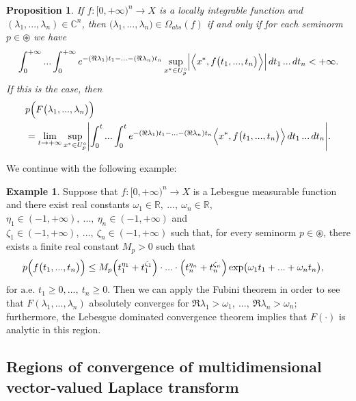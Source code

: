 \documentclass{amsart}
\newtheorem{prop}[thm]{Proposition}
\theoremstyle{definition}
\newtheorem{example}[thm]{Example}
\theoremstyle{remark}
\numberwithin{equation}{section}
\begin{document}
\begin{prop}\label{sor}
If $f: [0,+\infty)^{n}\rightarrow X$ is a locally integrable function and\\ $(\lambda_{1},...,\lambda_{n})\in {\mathbb C}^{n}$, then
$(\lambda_{1},...,\lambda_{n}\bigr)\in \Omega_{abs}(f)$ if and only if for each seminorm $p\in \circledast$ we have 
$$
\int^{+\infty}_{0}...\int^{+\infty}_{0}e^{-(\Re \lambda_{1})t_{1}-...-(\Re \lambda_{n})t_{n}}  \sup_{x^{\ast}\in U_{p}^{\circ}}\Bigl| \Bigl \langle x^{\ast}, f\bigl(t_{1},...,t_{n}\bigr) \Bigr \rangle \Bigr| \, dt_{1}\, ...\, dt_{n}<+\infty.
$$
If this is the case, then 
\begin{align*} &
p\Bigl( F\bigl( \lambda_{1},...,\lambda_{n} \bigr)\Bigr)
\\& =\lim_{t\rightarrow +\infty}\sup_{x^{\ast}\in U_{p}^{\circ}}\Biggl|  \int^{t}_{0}...\int^{t}_{0}e^{-(\Re \lambda_{1})t_{1}-...-(\Re \lambda_{n})t_{n}}  \Bigl \langle x^{\ast}, f\bigl(t_{1},...,t_{n}\bigr) \Bigr \rangle  \, dt_{1}\, ...\, dt_{n}  \Biggr|.
\end{align*}
\end{prop}

We continue with the following example:

\begin{example}\label{pfk}
Suppose that $f: [0,+\infty)^{n} \rightarrow X$ is a Lebesgue measurable function and there exist real constants $\omega_{1}\in {\mathbb R},\ ...,\ \omega_{n}\in {\mathbb R},$ $\eta_{1}\in (-1,+\infty),\ ...,\ \eta_{n}\in (-1,+\infty)$ and $\zeta_{1}\in (-1,+\infty),\ ...,\ \zeta_{n}\in (-1,+\infty)$ such that, for every seminorm $p\in \circledast$, there exists a finite real constant $M_{p}>0$ such that
\begin{align}\label{zuca}
p\Bigl( f\bigl(t_{1},...,t_{n}\bigr)\Bigr) & \leq M_{p}\Bigl( t_{1}^{\eta_{1}} +t_{1}^{\zeta_{1}}\Bigr)\cdot ...\cdot \Bigl( t_{n}^{\eta_{n}} +t_{n}^{\zeta_{n}}\Bigr)\exp \bigl(\omega_{1}t_{1}+...+\omega_{n}t_{n}\bigr),
\end{align}
$\mbox{for a.e. }t_{1}\geq 0, ..., \ t_{n}\geq 0.$
Then we can apply the Fubini theorem in order to see that $F(\lambda_{1},...,\lambda_{n})$ absolutely converges for $\Re \lambda_{1}>\omega_{1},\ ...,\ \Re \lambda_{n}>\omega_{n};$ furthermore, the Lebesgue dominated convergence theorem implies that $F(\cdot)$ is analytic in this region.
\end{example}

\subsection{Regions of convergence of multidimensional vector-valued Laplace transform}\label{regions}
\end{document}
